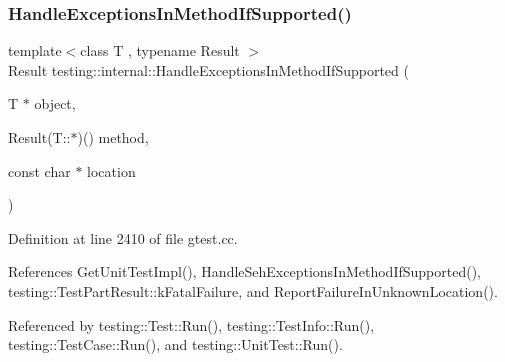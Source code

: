 \subsubsection{\texorpdfstring{Handle\+Exceptions\+In\+Method\+If\+Supported()}{HandleExceptionsInMethodIfSupported()}}
{\footnotesize\ttfamily template$<$class T , typename Result $>$ \\
Result testing\+::internal\+::\+Handle\+Exceptions\+In\+Method\+If\+Supported (\begin{DoxyParamCaption}\item[{T $\ast$}]{object,  }\item[{Result(T\+::$\ast$)()}]{method,  }\item[{const char $\ast$}]{location }\end{DoxyParamCaption})}



Definition at line 2410 of file gtest.\+cc.



References Get\+Unit\+Test\+Impl(), Handle\+Seh\+Exceptions\+In\+Method\+If\+Supported(), testing\+::\+Test\+Part\+Result\+::k\+Fatal\+Failure, and Report\+Failure\+In\+Unknown\+Location().



Referenced by testing\+::\+Test\+::\+Run(), testing\+::\+Test\+Info\+::\+Run(), testing\+::\+Test\+Case\+::\+Run(), and testing\+::\+Unit\+Test\+::\+Run().


